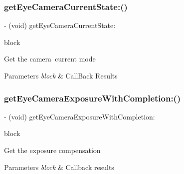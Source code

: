\subsubsection{\texorpdfstring{get\+Eye\+Camera\+Current\+State\+:()}{getEyeCameraCurrentState:()}}
{\footnotesize\ttfamily -\/ (void) get\+Eye\+Camera\+Current\+State\+: \begin{DoxyParamCaption}\item[{(void($^\wedge$)(P\+V\+Eye\+Camera\+State camerastate, N\+S\+Error $\ast$\+\_\+\+Nullable error))}]{block }\end{DoxyParamCaption}}

Get the camera current mode


\begin{DoxyParams}{Parameters}
{\em block} & Call\+Back Results \\
\hline
\end{DoxyParams}
\mbox{\label{interface_p_v_eye_camera_ac3439eeba740cbaf3d23d277126111f5}} 
\subsubsection{\texorpdfstring{get\+Eye\+Camera\+Exposure\+With\+Completion\+:()}{getEyeCameraExposureWithCompletion:()}}
{\footnotesize\ttfamily -\/ (void) get\+Eye\+Camera\+Exposure\+With\+Completion\+: \begin{DoxyParamCaption}\item[{(void($^\wedge$)(N\+S\+Integer exposure, N\+S\+Error $\ast$\+\_\+\+Nullable error))}]{block }\end{DoxyParamCaption}}

Get the exposure compensation


\begin{DoxyParams}{Parameters}
{\em block} & Callback results \\
\hline
\end{DoxyParams}
\mbox{\label{interface_p_v_eye_camera_a5b87772c0b948e3c9468e2b801f0adfa}} 
